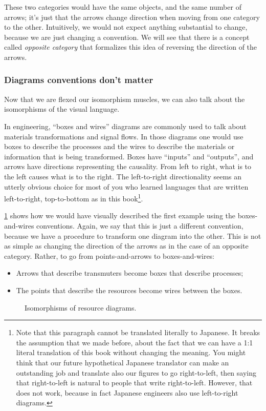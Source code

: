 These two categories would have the same objects, and the same number of arrows; it's just 
that the arrows change direction when moving from one category to the other. 
Intuitively, we would not expect anything substantial to change, because we are 
just changing a convention. We will see that there is a concept called \emph{opposite category}
that formalizes this idea of reversing the direction of the arrows. 


\subsubsection{Diagrams conventions don't matter}

Now that we are flexed our isomorphism muscles, we can also talk about the isomorphisms 
of the visual language. 

In engineering, ``boxes and wires'' diagrams are commonly used to talk about 
materials transformations and signal flows. In those diagrams one would use 
boxes to describe the processes and the wires to describe the materials or information
that is being transformed. Boxes have ``inputs'' and ``outputs'', and arrows have 
directions representing the causality. From left to right, what is to the left causes what is to the right.
The left-to-right directionality seems an utterly obvious choice for most of you 
who learned languages that are written left-to-right, top-to-bottom as in this book\footnote{
Note that this paragraph cannot be translated literally to Japanese. It breaks the assumption
that we made before, about the fact that we can have a 1:1 literal translation of this book
without changing the meaning. You might think that our future hypothetical Japanese
translator can make an outstanding job and translate also our figures to go right-to-left,
then saying that right-to-left is natural to people that write right-to-left. However,
that does not work, because in fact Japanese engineers also use left-to-right diagrams.}.

\cref{fig:isodiagrams} shows how we would have visually described
the first example using the boxes-and-wires conventions. 
Again, we say that this is just a different convention, because
we have a procedure to transform one diagram into the other. 
This is not as simple as changing the direction of the arrows as in the case of an 
opposite category. Rather, to go from points-and-arrows to boxes-and-wires:
\begin{itemize}
    \item Arrows that describe transmuters become boxes that describe processes;
    \item The points that describe the resources become wires between the boxes.
\end{itemize}


\begin{figure}[h!]
    \centering
    
    \caption{Isomorphisms of resource diagrams. \label{fig:isodiagrams} }
\end{figure}



